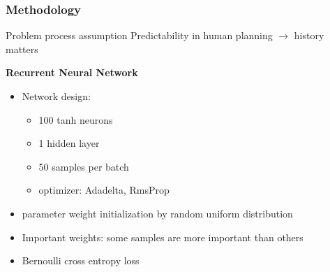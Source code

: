 \documentclass{beamer}
\begin{document}
\begin{frame}
\frametitle{Methodology}

\begin{block}{Problem process assumption}
Predictability in human planning $\rightarrow$ history matters
\end{block}

\textbf{Recurrent Neural Network}
\begin{itemize}
    \item Network design:
    \begin{itemize}
        \item 100 tanh neurons
        \item 1 hidden layer
        \item 50 samples per batch
        \item optimizer: Adadelta, RmsProp
    \end{itemize}
    \item parameter weight initialization by random uniform distribution
    \item Important weights: some samples are more important than others
    \item Bernoulli cross entropy loss%
\end{itemize}
\end{frame}
\end{document}
